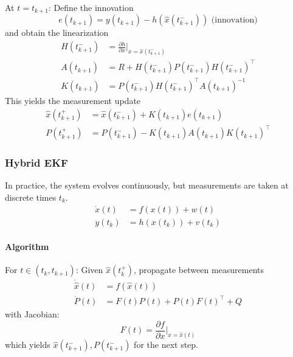 \newpar{}

At $t = t_{k+1}$: Define the innovation
\begin{equation*}
    e(t_{k+1}) = y(t_{k+1}) - h(\hat{x}(t_{k+1}^-)) \text{ (innovation)}
\end{equation*}
and obtain the linearization
\begin{align*}
    H(t_{k+1}^-) & = \frac{\partial h}{\partial x} \bigg|_{x = \hat{x}(t_{k+1}^-)} \\
    A(t_{k+1})   & = R + H(t_{k+1}^-) P(t_{k+1}^-) {H(t_{k+1}^-)}^\top             \\
    K(t_{k+1})   & = P(t_{k+1}^-) {H(t_{k+1}^-)}^\top {A(t_{k+1})}^{-1}
\end{align*}
This yields the measurement update
\begin{align*}
    \hat{x}(t_{k+1}^+) & = \hat{x}(t_{k+1}^-) + K(t_{k+1}) e(t_{k+1})             \\
    P(t_{k+1}^+)       & = P(t_{k+1}^-) - K(t_{k+1}) A(t_{k+1}) {K(t_{k+1})}^\top
\end{align*}

\subsubsection{Hybrid EKF}
In practice, the system evolves continuously, but measurements are taken at discrete times $t_k$.
\begin{align*}
    \dot{x}(t) & = f(x(t)) + w(t)     \\
    y(t_k)     & = h(x(t_k)) + v(t_k)
\end{align*}

\paragraph{Algorithm}


For $t \in (t_k, t_{k+1})$: Given $\hat{x}(t_k^+)$, propagate between measurements
\begin{align*}
    \dot{\hat{x}}(t) & = f(\hat{x}(t))                    \\
    \dot{P}(t)       & = F(t) P(t) + P(t) {F(t)}^\top + Q
\end{align*}
with Jacobian:
\begin{equation*}
    F(t) = \frac{\partial f}{\partial x} \bigg|_{x = \hat{x}(t)}
\end{equation*}
which yields $\hat{x}(t_{k+1}^-), P(t_{k+1}^-)$ for the next step.

